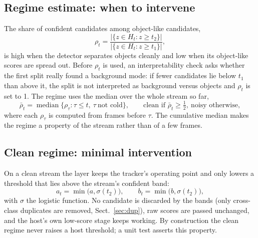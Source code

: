 \documentclass[pdflatex,sn-mathphys-num]{sn-jnl}
\begin{document}
\subsection{Regime estimate: when to intervene}\label{sec:regime}
The share of confident candidates among object-like candidates,
\begin{equation}
\rho_t=\frac{\bigl|\{z\in H_t: z\ge t_2\}\bigr|}{\bigl|\{z\in H_t: z\ge t_1\}\bigr|},
\end{equation}
is high when the detector separates objects cleanly and low when its object-like scores are spread out. Before $\rho_t$ is used, an interpretability check asks whether the first split really found a background mode: if fewer candidates lie below $t_1$ than above it, the split is not interpreted as background versus objects and $\rho_t$ is set to 1. The regime uses the median over the whole stream so far,
\begin{equation}
\bar\rho_t=\operatorname{median}\{\rho_\tau:\tau\le t,\ \tau\ \text{not cold}\},\qquad \text{clean if } \bar\rho_t\ge \tfrac12,\ \text{noisy otherwise},
\end{equation}
where each $\rho_\tau$ is computed from frames before $\tau$. The cumulative median makes the regime a property of the stream rather than of a few frames.

\subsection{Clean regime: minimal intervention}\label{sec:clean}
On a clean stream the layer keeps the tracker's operating point and only lowers a threshold that lies above the stream's confident band:
\begin{equation}
a_t=\min\bigl(a,\sigma(t_2)\bigr),\qquad b_t=\min\bigl(b,\sigma(t_2)\bigr),
\end{equation}
with $\sigma$ the logistic function. No candidate is discarded by the bands (only cross-class duplicates are removed, Sect.~\ref{sec:dup}), raw scores are passed unchanged, and the host's own low-score stage keeps working. By construction the clean regime never raises a host threshold; a unit test asserts this property.
\end{document}
